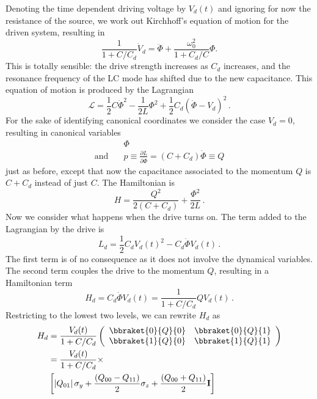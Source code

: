 Denoting the time dependent driving voltage by $V_d(t)$ and ignoring for now the resistance of the source, we work out Kirchhoff's equation of motion for the driven system, resulting in
\begin{equation}
\frac{1}{1+C/C_d} \dot{V}_d = \ddot{\Phi} + \frac{\omega_0^2}{1 + C_d/C} \Phi. \end{equation}
This is totally sensible: the drive strength increases as $C_d$ increases, and the resonance frequency of the LC mode has shifted due to the new capacitance.
This equation of motion is produced by the Lagrangian
\begin{equation}
\mathcal{L} = \frac{1}{2}C \dot{\Phi}^2 - \frac{1}{2L}\Phi^2 + \frac{1}{2} C_d \left( \dot{\Phi} - V_d \right)^2 \, .
\end{equation}
For the sake of identifying canonical coordinates we consider the case $V_d=0$, resulting in canonical variables
\begin{align*}
  & \Phi \\
  \textrm{and} \quad & p \equiv \frac{\partial L}{\partial \dot{\Phi}} = \left( C + C_d \right) \dot{\Phi} \equiv Q
\end{align*}
just as before, except that now the capacitance associated to the momentum $Q$ is $C+C_d$ instead of just $C$.
The Hamiltonian is
\begin{equation}
H = \frac{Q^2}{2 (C + C_d)} + \frac{\Phi^2}{2L} \, .
\end{equation}
Now we consider what happens when the drive turns on.
The term added to the Lagrangian by the drive is
\begin{equation}
L_d = \frac{1}{2}C_d V_d(t)^2 - C_d \dot{\Phi} V_d(t) \, .
\end{equation}
The first term is of no consequence as it does not involve the dynamical variables.
The second term couples the drive to the momentum $Q$, resulting in a Hamiltonian term
\begin{equation*}
H_d
  = C_d \dot{\Phi}V_d(t)
  = \frac{1}{1+C/C_d} Q V_d(t) \, . \label{eq:sec:driving:H_dVsCircuitParams}
\end{equation*}
Restricting to the lowest two levels, we can rewrite $H_d$ as
\begin{align}
H_d
&= \frac{V_d(t)}{1 + C/C_d} \left(
{\begin{array}{cc}\bbraket{0}{Q}{0} & \bbraket{0}{Q}{1} \\ \bbraket{1}{Q}{0} & \bbraket{1}{Q}{1}\end{array}}
\right) \\
&= \frac{V_d(t)}{1 + C/C_d} \times \nonumber \\
&\left[
\left| Q_{01} \right| \sigma_y
+ \frac{\left( Q_{00} - Q_{11} \right)}{2} \sigma_z
+ \frac{\left( Q_{00} + Q_{11} \right)}{2} \mathbf{I}
\right]
\end{align}
